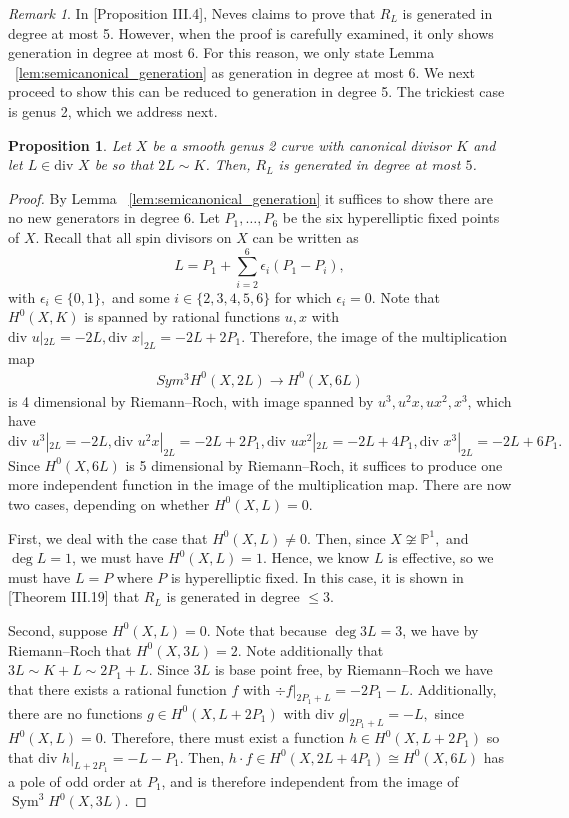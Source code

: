 \documentclass{amsart}
\theoremstyle{plain}
\newtheorem{prop}[thm]{Proposition}
\theoremstyle{definition}
\theoremstyle{remark}
\newtheorem{rem}[thm]{Remark}
\numberwithin{equation}{section}
\newcommand\BP{{\mathbb P}}
\newcommand \di{\text{div }}
\DeclareMathOperator{\sym}{Sym}
\begin{document}
\begin{rem}
In \cite{neves:halfcan}[Proposition III.4], Neves claims to prove that $R_L$ is generated in degree at most 5. However, when the proof is carefully examined, it only shows generation in degree at most 6. For this reason, we only state Lemma ~\ref{lem:semicanonical_generation} as generation in degree at most 6. We next proceed to show this can be reduced to generation in degree 5. The trickiest case is genus 2, which we address next.
\end{rem}



\begin{prop}
\label{prop:genus_2_generation_5}
Let $X$ be a smooth genus 2 curve with canonical divisor $K$ and let $L \in \di X$ be so that $2L \sim K$. 
Then, $R_L$ is generated in degree at most $5$.
\end{prop}
\begin{proof}
By Lemma ~\ref{lem:semicanonical_generation} it suffices to show there are no new generators in degree 6.
Let $P_1,\ldots, P_6$ be the six hyperelliptic fixed points of $X$. 
Recall that all spin divisors on $X$ can be written as 
$$L = P_1 + \sum_{i=2}^{6} \epsilon_i (P_1 - P_i),$$ 
with $\epsilon_i \in \{0,1\},$ and some $i \in \{2, 3, 4, 5, 6\}$ for which $\epsilon_i = 0$. 
Note that $H^0(X,K)$ is spanned by rational functions $u,x$ with $\di u|_{2L} = -2L, \di x|_{2L} = -2L + 2P_1.$ Therefore, the image of the multiplication map 
\begin{align*}
	Sym^3 H^0(X,2L) \rightarrow H^0(X,6L)
\end{align*}
is 4 dimensional by Riemann--Roch, with image spanned by $u^3,u^2x,ux^2,x^3$, 
which have $\di u^3|_{2L} = -2L, \di u^2x|_{2L} = -2L + 2P_1,\di ux^2|_{2L} = -2L+4P_1, \di x^3|_{2L} = -2L + 6P_1.$ 
Since $H^0(X,6L)$ is 5 dimensional by Riemann--Roch,
it suffices to produce one more independent function in the image of the multiplication map.
There are now two cases, depending on whether $H^0(X,L) = 0$.

First, we deal with the case that $H^0(X,L) \neq 0$. 
Then, since $X \not \cong \BP^1,$ and $\deg L = 1$, we must have $H^0(X,L) = 1$. Hence, we know $L$ is effective, so we must have $L = P$ where $P$ is hyperelliptic fixed. In this case, it is shown in \cite{neves:halfcan}[Theorem III.19] that $R_L$ is generated in degree $\leq 3$.

Second, suppose $H^0(X,L) = 0$.
Note that because $\deg 3L = 3$, we have by Riemann--Roch that $H^0(X,3L) = 2$. 
Note additionally that $3L \sim K + L \sim 2P_1 + L$. Since $3L$ is base point free, by Riemann--Roch
we have that there exists a rational function $f$ with $\div f|_{2P_1 + L} = -2P_1 - L.$ Additionally, there are no functions $g \in H^0(X,L + 2P_1)$ 
with $\di g|_{2P_1 + L} = -L,$ since $H^0(X,L) = 0.$ Therefore, there must 
exist a function $h \in H^0(X,L+2P_1)$ so that $\di h|_{L + 2P_1} = -L - P_1$.
Then, $h \cdot f \in H^0(X,2L + 4P_1) \cong H^0(X,6L)$ has a pole of odd 
order at $P_1$, and is therefore independent from the image of $\sym^3 H^0(X,3L)$.
\end{proof}
\end{document}
